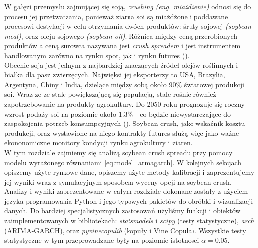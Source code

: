 W gałęzi przemysłu zajmującej się soją, \emph{crushing} \emph{(eng. miażdżenie)} odnosi się do procesu jej przetwarzania, ponieważ ziarna soi są miażdżone i poddawane procesowi destylacji w celu otrzymania dwóch produktów: śruty sojowej \emph{(soybean meal)}, oraz oleju sojowego \emph{(soybean oil)}. Różnica między ceną przerobionych produktów a ceną surowca nazywana jest \emph{crush spreadem} i jest instrumentem handlowanym zarówno na rynku spot, jak i rynku futures (\cite{CME_soybean}).\\
Obecnie soja jest jednym z najbardziej znaczących źródeł olejów roślinnych i białka dla pasz zwierzęcych. Najwięksi jej eksporterzy to USA, Brazylia, Argentyna, Chiny i India, dzielące między sobą około 90\% światowej produkcji soi. Wraz ze ze stale powiększającą się populacją, stale rośnie również zapotrzebowanie na produkty agrokultury. Do 2050 roku prognozuje się roczny wzrost podaży soi na poziomie około $1.3\%$ - co będzie niewystarczające do zaspokojenia potrzeb konsumpcyjnych (\cite{Pagano_Soybean_importance}). Soybean crush, jako wskaźnik kosztu produkcji, oraz wystawione na niego kontrakty futures służą więc jako ważne ekononomiczne monitory kondycji rynku agrokultury i ziaren.\\

W tym rozdziale zajmiemy się analizą soybean crush spreadu przy pomocy modelu wyrażonego równaniami \ref{eq:model_armagarch}. W kolejnych sekcjach opiszemy użyte rynkowe dane, opiszemy użyte metody kalibracji i zaprezentujemy jej wyniki wraz z symulacyjnym sposobem wyceny opcji na soybean crush.\\
Analizy i wyniki zaprezentowane w całym rozdziale dokonane zostały z użyciem języka programowania Python i jego typowych pakietów do obróbki i wizualizacji danych. Do bardziej specjalistycznych zastosowań użyliśmy funkcji i obiektów zaimplementowanych w bibliotekach: \href{https://www.statsmodels.org/stable/index.html}{\emph{statsmodels}} i \href{https://docs.scipy.org/doc/scipy/}{\emph{scipy}} (testy statystyczne), \href{https://arch.readthedocs.io/en/latest/univariate/introduction.html}{\emph{arch}} (ARIMA-GARCH), oraz \href{https://vinecopulib.github.io/pyvinecopulib/}{\emph{pyvinecopulib}} (kopuły i Vine Copula). Wszystkie testy statystyczne w tym przeprowadzane były na poziomie istotności $\alpha = 0.05$.